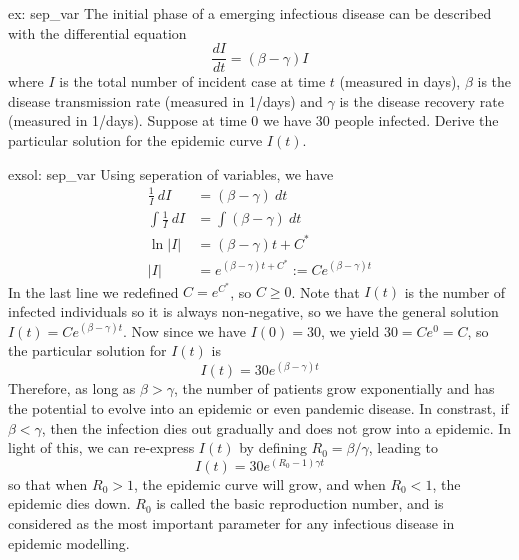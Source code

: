 \pagebreak

\begin{ex}[]{ex: sep_var}
    The initial phase of a emerging infectious disease can be described with the differential equation
    \[\frac{dI}{dt} =  (\beta - \gamma)I\]
    where $I$ is the total number of incident case at time $t$ (measured in days),  $\beta$ is the disease transmission rate (measured in 1/days) and $\gamma$ is the disease recovery rate (measured in 1/days).  Suppose at time $0$ we have 30 people infected.  Derive the particular solution for the epidemic curve $I(t)$.
\end{ex}

\begin{exsol}[]{exsol: sep_var}
    Using seperation of variables, we have
    \begin{align*}
        \frac{1}{I}~dI &= (\beta - \gamma)~dt\\
        \int \frac{1}{I}~dI &= \int (\beta - \gamma)~dt\\
        \ln |I| &= (\beta - \gamma)t + C^*\\
        |I| &= e^{(\beta-\gamma)t + C^*} := Ce^{(\beta-\gamma)t}
    \end{align*}
    In the last line we redefined $C = e^{C^*}$, so $C \ge 0$.  Note that $I(t)$ is the number of infected individuals so it is always non-negative, so we have the general solution $I(t) = Ce^{(\beta-\gamma)t}$.  Now since we have $I(0) = 30$, we yield $30 = Ce^0 = C$, so the particular solution for $I(t)$ is
    \[I(t) = 30e^{(\beta-\gamma)t}\]
    Therefore, as long as $\beta > \gamma$, the number of patients grow exponentially and has the potential to evolve into an epidemic or even pandemic disease.  In constrast, if $\beta < \gamma$, then the infection dies out gradually and does not grow into a epidemic.  In light of this, we can re-express $I(t)$ by defining $R_0 = \beta/\gamma$, leading to
    \[I(t) = 30e^{(R_0 - 1)\gamma t}\]
    so that when $R_0 > 1$, the epidemic curve will grow, and when $R_0 < 1$, the epidemic dies down.  $R_0$ is called the basic reproduction number, and is considered as the most important parameter for any infectious disease in epidemic modelling. 
\end{exsol}


